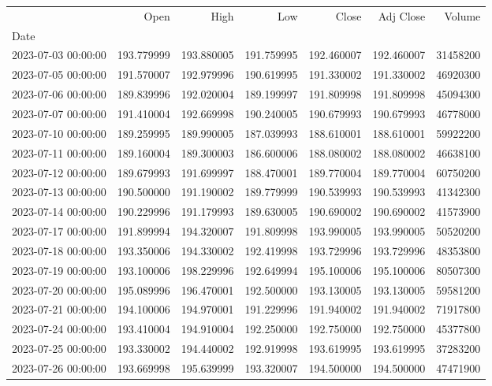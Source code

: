\begin{tabular}{lrrrrrr}
\toprule
 & Open & High & Low & Close & Adj Close & Volume \\
Date &  &  &  &  &  &  \\
\midrule
2023-07-03 00:00:00 & 193.779999 & 193.880005 & 191.759995 & 192.460007 & 192.460007 & 31458200 \\
2023-07-05 00:00:00 & 191.570007 & 192.979996 & 190.619995 & 191.330002 & 191.330002 & 46920300 \\
2023-07-06 00:00:00 & 189.839996 & 192.020004 & 189.199997 & 191.809998 & 191.809998 & 45094300 \\
2023-07-07 00:00:00 & 191.410004 & 192.669998 & 190.240005 & 190.679993 & 190.679993 & 46778000 \\
2023-07-10 00:00:00 & 189.259995 & 189.990005 & 187.039993 & 188.610001 & 188.610001 & 59922200 \\
2023-07-11 00:00:00 & 189.160004 & 189.300003 & 186.600006 & 188.080002 & 188.080002 & 46638100 \\
2023-07-12 00:00:00 & 189.679993 & 191.699997 & 188.470001 & 189.770004 & 189.770004 & 60750200 \\
2023-07-13 00:00:00 & 190.500000 & 191.190002 & 189.779999 & 190.539993 & 190.539993 & 41342300 \\
2023-07-14 00:00:00 & 190.229996 & 191.179993 & 189.630005 & 190.690002 & 190.690002 & 41573900 \\
2023-07-17 00:00:00 & 191.899994 & 194.320007 & 191.809998 & 193.990005 & 193.990005 & 50520200 \\
2023-07-18 00:00:00 & 193.350006 & 194.330002 & 192.419998 & 193.729996 & 193.729996 & 48353800 \\
2023-07-19 00:00:00 & 193.100006 & 198.229996 & 192.649994 & 195.100006 & 195.100006 & 80507300 \\
2023-07-20 00:00:00 & 195.089996 & 196.470001 & 192.500000 & 193.130005 & 193.130005 & 59581200 \\
2023-07-21 00:00:00 & 194.100006 & 194.970001 & 191.229996 & 191.940002 & 191.940002 & 71917800 \\
2023-07-24 00:00:00 & 193.410004 & 194.910004 & 192.250000 & 192.750000 & 192.750000 & 45377800 \\
2023-07-25 00:00:00 & 193.330002 & 194.440002 & 192.919998 & 193.619995 & 193.619995 & 37283200 \\
2023-07-26 00:00:00 & 193.669998 & 195.639999 & 193.320007 & 194.500000 & 194.500000 & 47471900 \\

\end{tabular}
